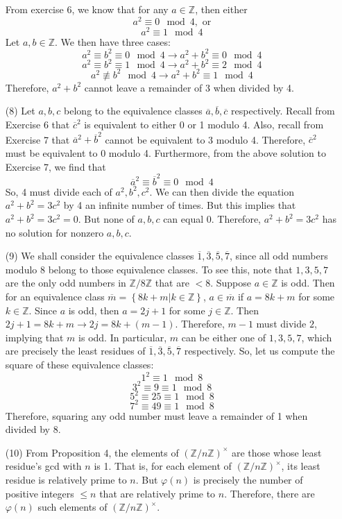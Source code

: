 \documentclass[12pt]{article}
\begin{document}
\begin{itemize}
From exercise 6, we know that for any $a \in \mathbb{Z}$, then either
$$a^2 \equiv 0 \mod 4, \text{ or}$$
$$a^2 \equiv 1 \mod 4$$
Let $a, b \in \mathbb{Z}$. We then have three cases:
$$a^2 \equiv b^2 \equiv 0 \mod 4 \rightarrow a^2 + b^2 \equiv 0 \mod 4$$
$$a^2 \equiv b^2 \equiv 1 \mod 4 \rightarrow a^2 + b^2 \equiv 2 \mod 4$$
$$a^2 \not \equiv b^2 \mod 4 \rightarrow a^2 + b^2 \equiv 1 \mod 4$$
Therefore, $a^2 + b^2$ cannot leave a remainder of 3 when divided by 4.
\item[(8)]
Let $a, b, c$ belong to the equivalence classes $\overline{a}, \overline{b}, \overline{c}$ respectively. Recall from Exercise 6 that $\overline{c}^2$ is equivalent to either 0 or 1 modulo 4. Also, recall from Exercise 7 that $\overline{a}^2 + \overline{b}^2$ cannot be equivalent to 3 modulo 4. Therefore, $\overline{c}^2$ must be equivalent to 0 modulo 4. Furthermore, from the above solution to Exercise 7, we find that
$$\overline{a}^2 \equiv \overline{b}^2 \equiv 0 \mod 4$$
So, 4 must divide each of $a^2, b^2, c^2$. We can then divide the equation $a^2 + b^2 = 3c^2$ by 4 an infinite number of times. But this implies that $a^2 + b^2 = 3c^2 = 0$. But none of $a, b, c$ can equal 0. Therefore, $a^2 + b^2 = 3c^2$ has no solution for nonzero $a, b, c$.
\item[(9)] We shall consider the equivalence classes $\overline{1}, \overline{3}, \overline{5}, \overline{7}$, since all odd numbers modulo 8 belong to those equivalence classes. To see this, note that $1, 3, 5, 7$ are the only odd numbers in $\mathbb{Z}/8\mathbb{Z}$ that are $< 8$. Suppose $a \in \mathbb{Z}$ is odd. Then for an equivalence class $\overline{m} = \left\lbrace 8k + m | k \in \mathbb{Z}\right\rbrace$, $a \in \overline{m}$ if $a = 8k + m$ for some $k \in \mathbb{Z}$. Since $a$ is odd, then $a = 2j + 1$ for some $j \in \mathbb{Z}$. Then $2j + 1 = 8k + m \rightarrow 2j = 8k + (m - 1)$. Therefore, $m - 1$ must divide $2$, implying that $m$ is odd. In particular, $m$ can be either one of $1, 3, 5, 7$, which are precisely the least residues of  $\overline{1}, \overline{3}, \overline{5}, \overline{7}$ respectively. So, let us compute the square of these equivalence classes:
$$1^2 \equiv 1 \mod 8$$
$$3^2 \equiv 9 \equiv 1 \mod 8$$
$$5^2 \equiv 25 \equiv 1 \mod 8$$
$$7^2 \equiv 49 \equiv 1 \mod 8$$
Therefore, squaring any odd number must leave a remainder of 1 when divided by 8.
\item[(10)] From Proposition 4, the elements of $(\mathbb{Z}/n\mathbb{Z})^\times$ are those whose least residue's gcd with $n$ is 1. That is, for each element of $(\mathbb{Z}/n\mathbb{Z})^\times$, its least residue is relatively prime to $n$. But $\varphi(n)$ is precisely the number of positive integers $\leq n$ that are relatively prime to $n$. Therefore, there are $\varphi(n)$ such elements of $(\mathbb{Z}/n\mathbb{Z})^\times$.

\end{itemize}
\end{document}
